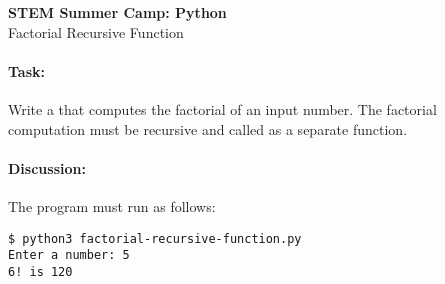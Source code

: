 \documentclass[11pt]{article}
\begin{document}
    \begin{center}

        \large\textbf{STEM Summer Camp: Python} \\
        Factorial Recursive Function \\

    \end{center}

    \paragraph{Task:} Write a that computes the factorial of an input
    number. The factorial computation must be recursive and called as a
    separate function.  
    
    \paragraph{Discussion:} The program must run as follows:
    
    \vspace{1.5em}

\begin{verbatim}
$ python3 factorial-recursive-function.py
Enter a number: 5
6! is 120
\end{verbatim}
    
\end{document}
